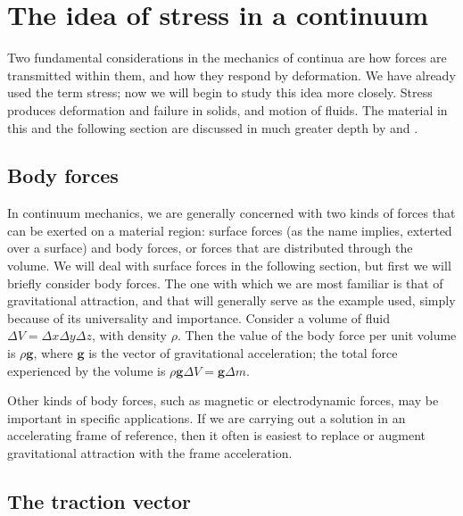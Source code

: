 \documentclass[a4paper,11pt]		{report}
\begin{document}
\section{The idea of stress in a continuum}

Two fundamental considerations in the mechanics of continua are how
forces are transmitted within them, and how they respond by
deformation. We have already used the term stress; now we will begin
to study this idea more closely. Stress produces deformation and
failure in solids, and motion of fluids. The material in this and the
following section are discussed in much greater depth by
\citet{fung69} and \citet{aris62}.

\subsection{Body forces}

In continuum mechanics, we are generally concerned with two kinds of
forces that can be exerted on a material region: surface forces (as
the name implies, exterted over a surface) and body forces, or forces
that are distributed through the volume. We will deal with surface
forces in the following section, but first we will briefly consider
body forces. The one with which we are most familiar is that of
gravitational attraction, and that will generally serve as the example
used, simply because of its universality and importance.  Consider a
volume of fluid $\Delta V=\Delta x\Delta y\Delta z$, with density
$\rho$. Then the value of the body force per unit volume is $\rho\mathbf{g}$,
where $\mathbf{g}$ is the vector of gravitational acceleration; the total
force experienced by the volume is $\rho\mathbf{g}\Delta V=\mathbf{g}\Delta m$.

Other kinds of body forces, such as magnetic or electrodynamic forces,
may be important in specific applications. If we are carrying out a
solution in an accelerating frame of reference, then it often is
easiest to replace or augment gravitational attraction with the frame
acceleration.

\subsection{The traction vector}
\end{document}

